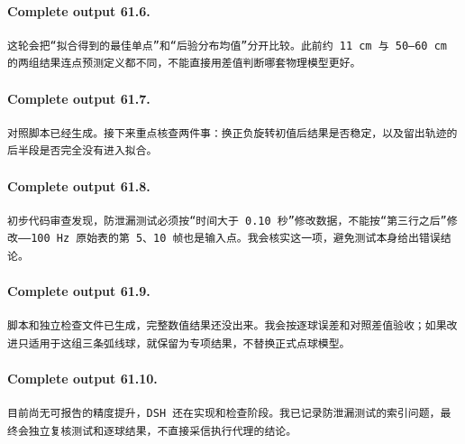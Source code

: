 \documentclass[UTF8,10pt]{ctexart}
\begin{document}
\paragraph{Complete output 61.6.}
\begin{Verbatim}[breaklines=true,breakanywhere=true,fontsize=\scriptsize,frame=single,framesep=2pt]
这轮会把“拟合得到的最佳单点”和“后验分布均值”分开比较。此前约 11 cm 与 50–60 cm 的两组结果连点预测定义都不同，不能直接用差值判断哪套物理模型更好。
\end{Verbatim}

\paragraph{Complete output 61.7.}
\begin{Verbatim}[breaklines=true,breakanywhere=true,fontsize=\scriptsize,frame=single,framesep=2pt]
对照脚本已经生成。接下来重点核查两件事：换正负旋转初值后结果是否稳定，以及留出轨迹的后半段是否完全没有进入拟合。
\end{Verbatim}

\paragraph{Complete output 61.8.}
\begin{Verbatim}[breaklines=true,breakanywhere=true,fontsize=\scriptsize,frame=single,framesep=2pt]
初步代码审查发现，防泄漏测试必须按“时间大于 0.10 秒”修改数据，不能按“第三行之后”修改——100 Hz 原始表的第 5、10 帧也是输入点。我会核实这一项，避免测试本身给出错误结论。
\end{Verbatim}

\paragraph{Complete output 61.9.}
\begin{Verbatim}[breaklines=true,breakanywhere=true,fontsize=\scriptsize,frame=single,framesep=2pt]
脚本和独立检查文件已生成，完整数值结果还没出来。我会按逐球误差和对照差值验收；如果改进只适用于这组三条弧线球，就保留为专项结果，不替换正式点球模型。
\end{Verbatim}

\paragraph{Complete output 61.10.}
\begin{Verbatim}[breaklines=true,breakanywhere=true,fontsize=\scriptsize,frame=single,framesep=2pt]
目前尚无可报告的精度提升，DSH 还在实现和检查阶段。我已记录防泄漏测试的索引问题，最终会独立复核测试和逐球结果，不直接采信执行代理的结论。
\end{Verbatim}
\end{document}
